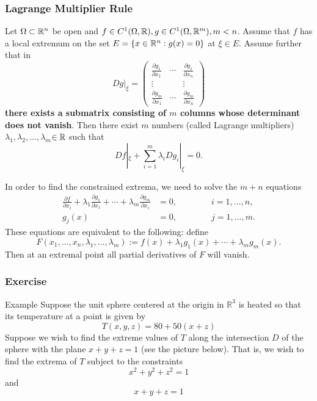 \documentclass[10pt, t, allowdisplaybreaks]{beamer}
\newcommand{\myseries}[2]{$#1_1,#1_2,\dots,#1_#2$}
\begin{document}
\begin{frame}[allowframebreaks]
    \frametitle{Lagrange Multiplier Rule}

    Let $\Omega\subset\mathbb{R}^n$ be open and $f\in C^1(\Omega,\mathbb{R}),g\in C^1(\Omega,\mathbb{R}^m),m<n$. Assume that $f$ has a local extremum on the set $E=\{x\in\mathbb{R}^n:g(x)=0\}$ at $\xi\in E$. Assume further that in
    \[Dg|_\xi=\begin{pmatrix}
            \frac{\partial g_1}{\partial x_1} & \cdots & \frac{\partial g_1}{\partial x_n} \\
            \vdots                            &        & \vdots                            \\
            \frac{\partial g_m}{\partial x_1} & \cdots & \frac{\partial g_m}{\partial x_n}
        \end{pmatrix}\]
    \textbf{there exists a submatrix consisting of $m$ columns whose determinant does
        not vanish}. Then there exist $m$ numbers (called Lagrange multipliers) \myseries{\lambda}{m}$\in\mathbb{R}$ such that
    \begin{equation}\label{2.7.4}
        Df|_\xi+\sum_{i=1}^{m}\lambda_i Dg_i|_\xi=0.
    \end{equation}

    In order to find the constrained extrema, we need to solve the $m + n$ equations
    \begin{align*}
        \frac{\partial f}{\partial x_i}+\lambda_1\frac{\partial g_1}{\partial x_1}+\cdots+\lambda_m\frac{\partial g_m}{\partial x_i} & =0,\qquad\qquad i=1,\ldots,n, \\
        g_j(x)                                                                                                                       & =0,\qquad\qquad j=1,\ldots,m.
    \end{align*}
    These equations are equivalent to the following: define
    \[F(x_1,\ldots,x_n,\lambda_1,\ldots,\lambda_m)
        :=f(x)+\lambda_1g_1(x)+\cdots+\lambda_mg_m(x).\]
    Then at an extremal point all partial derivatives of $F$ will vanish.
\end{frame}

\begin{frame}
    \frametitle{Exercise}
    Example Suppose the unit sphere centered at the origin in $\mathbb{R}^{3}$ is heated so that its temperature at a point is given by
    \[
        T(x, y, z)=80+50(x+z)
    \]
    Suppose we wish to find the extreme values of $T$ along the intersection $D$ of the sphere with the plane $x+y+z=1$ (see the picture below). That is, we wish to find the extrema of $T$ subject to the constraints
    \[
        x^{2}+y^{2}+z^{2}=1
    \]
    and
    \[
        x+y+z=1
    \]

\end{frame}
\end{document}
